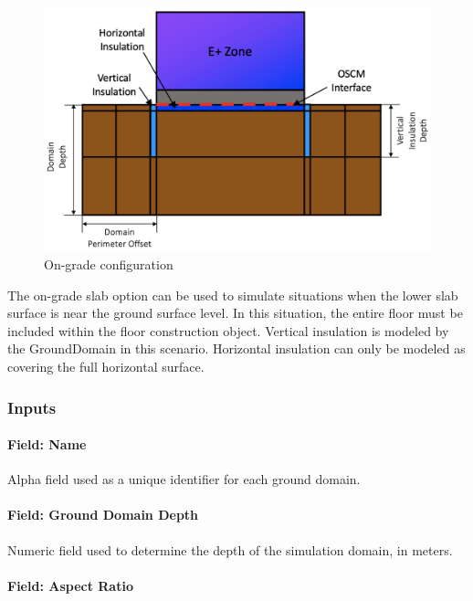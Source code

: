\begin{figure}[htbp]
\centering
\includegraphics{media/image013.png}
\caption{On-grade configuration \protect \label{fig:on-grade-configuration}}
\end{figure}

The on-grade slab option can be used to simulate situations when the lower slab surface is near the ground surface level. In this situation, the entire floor must be included within the floor construction object. Vertical insulation is modeled by the GroundDomain in this scenario. Horizontal insulation can only be modeled as covering the full horizontal surface.

\subsubsection{Inputs}\label{inputs-16-006}

\paragraph{Field: Name}\label{field-name-8-009}

Alpha field used as a unique identifier for each ground domain.

\paragraph{Field: Ground Domain Depth}\label{field-ground-domain-depth}

Numeric field used to determine the depth of the simulation domain, in meters.

\paragraph{Field: Aspect Ratio}\label{field-aspect-ratio}

